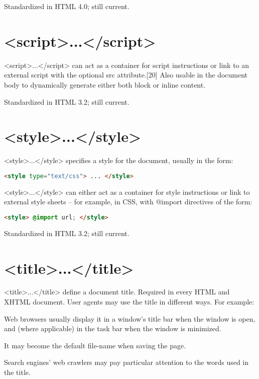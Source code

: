 Standardized in HTML 4.0; still current.



\section{<script>...</script>}

<script>...</script> can act as a container for script instructions or link to an external script with the optional src attribute.[20] Also usable in the document body to dynamically generate either both block or inline content.

Standardized in HTML 3.2; still current.



\section{<style>...</style>}

<style>...</style> specifies a style for the document, usually in the form:

\begin{lstlisting}[language=HTML]
  <style type="text/css"> ... </style>
\end{lstlisting}

<style>...</style> can either act as a container for style instructions or link to external style sheets – for example, in CSS, with @import directives of the form:

\begin{lstlisting}[language=HTML]
  <style> @import url; </style>
\end{lstlisting}


Standardized in HTML 3.2; still current.

\section{<title>...</title>}

<title>...</title> define a document title. Required in every HTML and XHTML document. User agents may use the title in different ways. For example:

\begin{compactitem}
\item Web browsers usually display it in a window's title bar when the window is open, and (where applicable) in the task bar when the window is minimized.
\item It may become the default file-name when saving the page.
\item Search engines’ web crawlers may pay particular attention to the words used in the title.
\end{compactitem}

